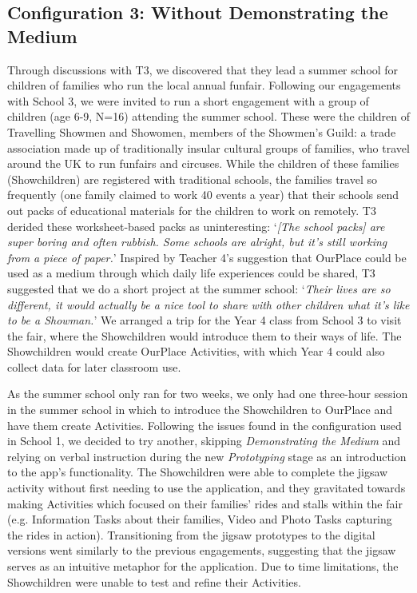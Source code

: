 \documentclass[,hyphens]{sigchi}
\begin{document}
\subsection{Configuration 3: Without Demonstrating the Medium}
Through discussions with T3, we discovered that they lead a summer school for children of families who run the local annual funfair. Following our engagements with School 3, we were invited to run a short engagement with a group of children (age 6-9, N=16) attending the summer school. These were the children of Travelling Showmen and Showomen, members of the Showmen's Guild: a trade association made up of traditionally insular cultural groups of families, who travel around the UK to run funfairs and circuses. While the children of these families (Showchildren) are registered with traditional schools, the families travel so frequently (one family claimed to work 40 events a year) that their schools send out packs of educational materials for the children to work on remotely. T3 derided these worksheet-based packs as uninteresting: `\textit{[The school packs] are super boring and often rubbish. Some schools are alright, but it's still working from a piece of paper.}' Inspired by Teacher 4's suggestion that OurPlace could be used as a medium through which daily life experiences could be shared, T3 suggested that we do a short project at the summer school: `\textit{Their lives are so different, it would actually be a nice tool to share with other children what it's like to be a Showman.}' We arranged a trip for the Year 4 class from School 3 to visit the fair, where the Showchildren would introduce them to their ways of life. The Showchildren would create OurPlace Activities, with which Year 4 could also collect data for later classroom use.

As the summer school only ran for two weeks, we only had one three-hour session in the summer school in which to introduce the Showchildren to OurPlace and have them create Activities. Following the issues found in the configuration used in School 1, we decided to try another, skipping \textit{Demonstrating the Medium} and relying on verbal instruction during the new \textit{Prototyping} stage as an introduction to the app's functionality. The Showchildren were able to complete the jigsaw activity without first needing to use the application, and they gravitated towards making Activities which focused on their families' rides and stalls within the fair (e.g. Information Tasks about their families, Video and Photo Tasks capturing the rides in action). Transitioning from the jigsaw prototypes to the digital versions went similarly to the previous engagements, suggesting that the jigsaw serves as an intuitive metaphor for the application. Due to time limitations, the Showchildren were unable to test and refine their Activities.
\end{document}
